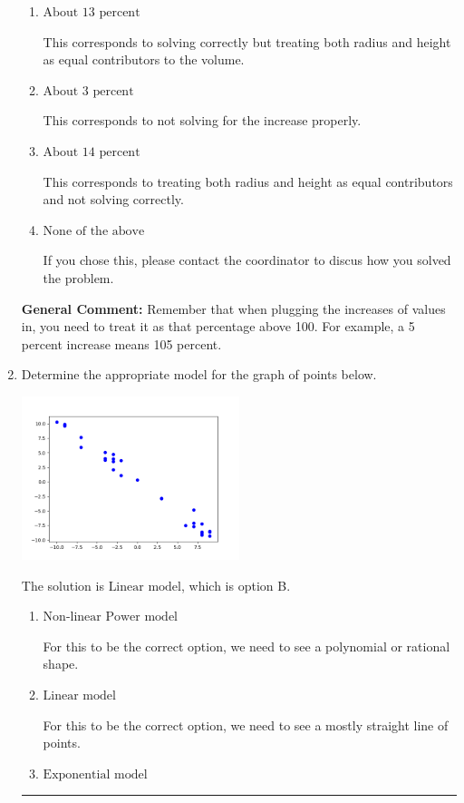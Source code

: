 \documentclass{extbook}[14pt]
\newcommand{\litem}[1]{\item #1

\rule{\textwidth}{0.4pt}}
\begin{document}
\begin{enumerate}
{\begin{enumerate}[label=\Alph*.]
* This is the correct option.
\item \( \text{About } 13 \text{ percent} \)

This corresponds to solving correctly but treating both radius and height as equal contributors to the volume.
\item \( \text{About } 3 \text{ percent} \)

This corresponds to not solving for the increase properly.
\item \( \text{About } 14 \text{ percent} \)

This corresponds to treating both radius and height as equal contributors and not solving correctly.
\item \( \text{None of the above} \)

If you chose this, please contact the coordinator to discus how you solved the problem.
\end{enumerate}

\textbf{General Comment:} Remember that when plugging the increases of values in, you need to treat it as that percentage above 100. For example, a 5 percent increase means 105 percent.
}
\litem{
Determine the appropriate model for the graph of points below.

\begin{center}
    \includegraphics[width=0.5\textwidth]{../Figures/identifyModelGraph12CopyB.png}
\end{center}


The solution is \( \text{Linear model} \), which is option B.\begin{enumerate}[label=\Alph*.]
\item \( \text{Non-linear Power model} \)

For this to be the correct option, we need to see a polynomial or rational shape.
\item \( \text{Linear model} \)

For this to be the correct option, we need to see a mostly straight line of points.
\item \( \text{Exponential model} \)


\end{enumerate}}
\end{enumerate}
\end{document}
